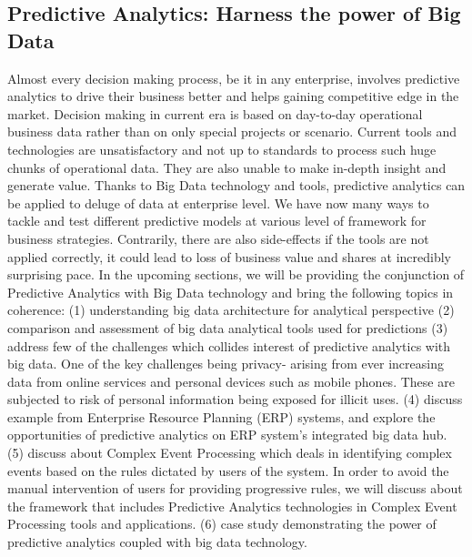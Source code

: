 \documentclass[runningheads]{llncs}
\begin{document}
\vspace{-4mm}
\subsection{Predictive Analytics: Harness the power of Big Data}Almost every decision making process, be it in any enterprise, involves predictive analytics to drive their business better and helps gaining competitive edge in the market. Decision making in current era is based on day-to-day operational business data rather than on only special projects or scenario. Current tools and technologies are unsatisfactory and not up to standards to process such huge chunks of operational data. They are also unable to make in-depth insight and generate value. \newline
Thanks to Big Data technology and tools, predictive analytics can be applied to deluge of data at enterprise level. We have now many ways to tackle and test different predictive models at various level of framework for business strategies. Contrarily, there are also side-effects if the tools are not applied correctly, it could lead to loss of business value and shares at incredibly surprising pace.\newline
In the upcoming sections, we will be providing the conjunction of Predictive Analytics with Big Data technology and bring the following topics in coherence:\newline
(1) understanding big data architecture for analytical perspective \newline
(2) comparison and assessment of big data analytical tools used for predictions \newline
(3) address few of the challenges which collides interest of predictive analytics with big data. One of the key challenges being privacy- arising from ever increasing data from online services and personal devices such as mobile phones. These are subjected to risk of personal information being exposed for illicit uses. \newline
(4) discuss example from Enterprise Resource Planning (ERP) systems, and explore the opportunities of predictive analytics on ERP system's integrated big data hub. \newline
(5) discuss about Complex Event Processing which deals in identifying complex events based on the rules dictated by users of the system. In order to avoid the manual intervention of users for providing progressive rules, we will discuss about the framework that includes Predictive Analytics technologies in Complex Event Processing tools and applications. \newline
(6) case study demonstrating the power of predictive analytics coupled with big data technology. \newline
\end{document}
